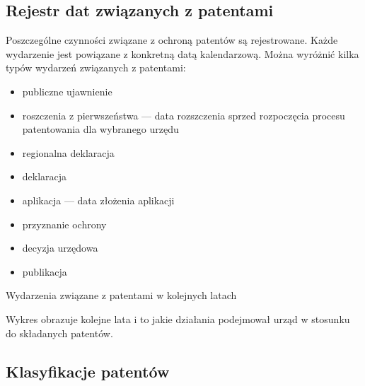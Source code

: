   \newpage\subsection
{Rejestr dat związanych z patentami}

Poszczególne czynności związane z ochroną patentów są rejestrowane.
Każde wydarzenie jest powiązane z konkretną datą kalendarzową.
Można wyróżnić kilka typów wydarzeń związanych z patentami:

  \begin{itemize}

\item
publiczne ujawnienie 


\item
roszczenia z pierwszeństwa  --- 
data rozszczenia sprzed rozpoczęcia procesu patentowania dla wybranego urzędu


\item
regionalna deklaracja 


\item
deklaracja 


\item
aplikacja  --- data złożenia aplikacji


\item
przyznanie ochrony 


\item
decyzja urzędowa


\item
publikacja
\end{itemize}



  \newpage
{}
{Wydarzenia związane z patentami w kolejnych latach}

Wykres obrazuje kolejne lata i to jakie
działania podejmował urząd w stosunku do składanych patentów.



  \newpage









\newpage
\subsection{Klasyfikacje patentów}

